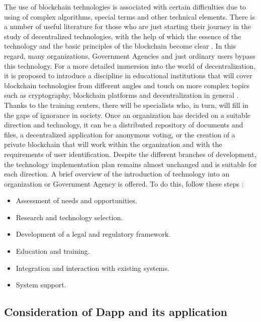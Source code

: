 \documentclass[10pt,conference,a4paper]{IEEEtran_EDM}
\begin{document}
The use of blockchain technologies is associated with certain difficulties due to using of complex algorithms, special terms and other technical elements.
There is a number of useful literature for those who are just starting their journey in the study of decentralized technologies, with the help of which the essence of the technology and the basic principles of the blockchain become clear \cite{Kube}.
In this regard, many organizations, Government Agencies and just ordinary users bypass this technology.
For a more detailed immersion into the world of decentralization, it is proposed to introduce a discipline in educational institutions that will cover blockchain technologies from different angles and touch on more complex topics such as cryptography, blockchain platforms and decentralization in general \cite{Bashir}.
Thanks to the training centers, there will be specialists who, in turn, will fill in the gaps of ignorance in society.
Once an organization has decided on a suitable direction and technology, it can be a distributed repository of documents and files, a decentralized application for anonymous voting, or the creation of a private blockchain that will work within the organization and with the requirements of user identification.
Despite the different branches of development, the technology implementation plan remains almost unchanged and is suitable for each direction.
A brief overview of the introduction of technology into an organization or Government Agency is offered.
To do this, follow these steps \cite{Talapina}:
\begin{itemize}
    \item Assessment of needs and opportunities.
    \item Research and technology selection.
    \item Development of a legal and regulatory framework.
    \item Education and training.
    \item Integration and interaction with existing systems.
    \item System support.
\end{itemize}

\subsection{Consideration of Dapp and its application}
\end{document}
